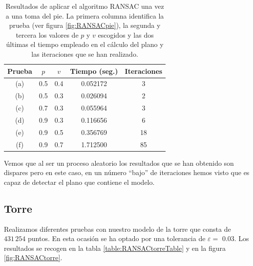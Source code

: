 \begin{table}[h!]
	\centering
	\begin{tabular}{| c | c | c || c | c |} 
		\hline
		Prueba & $ p $ & $ v $ & Tiempo (seg.) & Iteraciones \\
		\hline
		(a) & 0.5 & 0.4 & 0.052172 & 3 \\		
		(b) & 0.5 & 0.3 & 0.026094 & 2  \\	
		(c) & 0.7 & 0.3 & 0.055964 &  3 \\
		(d) & 0.9 & 0.3 & 0.116656 & 6\\
		(e) & 0.9 & 0.5 & 0.356769 & 18\\
		(f) & 0.9 & 0.7 & 1.712500 & 85\\
		\hline
	\end{tabular}
	\caption{Resultados de aplicar el algoritmo RANSAC una vez a una toma del pie. La primera columna identifica la prueba (ver figura \ref{fig:RANSACpie}), la segunda y tercera los valores de $ p $ y $ v $ escogidos y las dos últimas el tiempo empleado en el cálculo del plano y las iteraciones que se han realizado.}
	\label{table:RANSACpieTable}
\end{table}

Vemos que al ser un proceso aleatorio los resultados que se han obtenido son dispares pero en este caso, en un número ``bajo'' de iteraciones hemos visto que es capaz de detectar el plano que contiene el modelo.

\subsection{Torre}
Realizamos diferentes pruebas con nuestro modelo de la torre que consta de $ 431\,254 $ puntos. En esta ocasión se ha optado por una tolerancia de $ \varepsilon =$ 0.03. Los resultados se recogen en la tabla \ref{table:RANSACtorreTable} y en la figura \ref{fig:RANSACtorre}. \\

